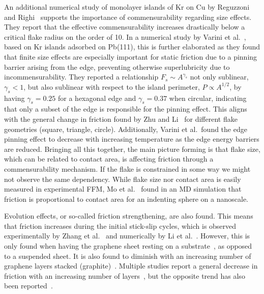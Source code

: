 An additional numerical study of monolayer islands of Kr on Cu by
Reguzzoni and Righi~\cite{PhysRevB.85.201412} supports the importance of
commensurability regarding size effects. They report that the effective
commensurability increases drastically below a critical flake radius on the order
of \SI{10}{}. In a numerical study by Varini et al.~\cite{Varini_2015},
based on Kr islands adsorbed on Pb(111), this is further elaborated as they
found that finite size effects are especially important for static friction due
to a pinning barrier arising from the edge, preventing otherwise superlubricity
due to incommensurability. They reported a relationship $F_s \sim A^{\gamma_s}$
not only sublinear, $\gamma_s < 1$, but also sublinear with respect to the
island perimeter, $P \propto A^{1/2}$, by having $\gamma_s = 0.25$ for a
hexagonal edge and $\gamma_s = 0.37$ when circular, indicating that only a
subset of the edge is responsible for the pinning effect. This aligns with the
general change in friction found by Zhu and Li~\cite{zhu_study_2018} for different flake
geometries (square, triangle, circle). Additionally, Varini et al.\ found the
edge pinning effect to decrease with increasing temperature as the edge energy
barriers are reduced. Bringing all this together, the main picture forming is
that flake size, which can be related to contact area, is affecting friction
through a commensurability mechanism. If the flake is constrained in some way we
might not observe the same dependency. While flake size nor contact area is
easily measured in experimental \acrshort{FFM}, Mo et
al.~\cite{mo_friction_2009} found in an \acrshort{MD} simulation that friction
is proportional to contact area for an indenting sphere on a nanoscale.


Evolution effects, or so-called friction strengthening, are also found. This means that friction increases during the initial stick-slip cycles, which is observed
experimentally by Zhang et al.~\cite{zhang_tuning_2019} and numerically by Li
et al.~\cite{li_evolving_2016}. However, this is only found when having the
graphene sheet resting on a substrate~\cite{zhang_tuning_2019}, as opposed to a
suspended sheet. It is also found to diminish with an increasing number of
graphene layers stacked (graphite)~\cite{li_evolving_2016}. Multiple studies report a general decrease in friction with an increasing number of layers~\cite{li_evolving_2016, Yoon2015MolecularDS, Paolicelli_2015, Filleter_2009, Lee_2010}, but the opposite trend has also been reported~\cite{Reguzzoni_2012}.


